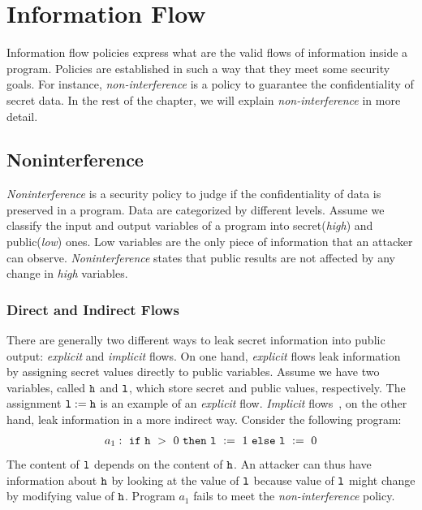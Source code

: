 \documentclass[a4paper]{report}
\begin{document}

\chapter{Information Flow}

Information flow policies express what are the valid flows of information
inside a program. Policies are established in such a way that they meet
some security goals. For instance, {\it non-interference} is a policy to
guarantee the confidentiality of secret data. In the rest of the chapter, we will explain
{\it non-interference} in more detail.

\section{Noninterference}
\label{chap2:noninterference}
{\it Noninterference} is a security policy to judge if the confidentiality of data
is preserved in a program. Data are categorized by different levels.
Assume we classify the input and output variables of a program 
into secret({\it high}) and public({\it low}) ones. 
Low variables are the only piece of information that an attacker can observe.
{\it Noninterference} states that public results are not affected by any
change in {\it high} variables. 

\subsection{Direct and Indirect Flows}
There are generally two different ways to leak secret information into
public output: {\it explicit} and {\it implicit} flows. 
On one hand,
{\it explicit} flows leak information by assigning secret values
directly to public variables.
Assume we have two variables, called $\mathtt{h}$ and $\mathtt{l}$,
which store secret and public values, respectively. 
The assignment $\mathtt{l} := \mathtt{h}$ is an example of an {\it explicit} flow.
{\it Implicit} flows~\cite{Denning:Denning:Certification}, on the other hand,
leak information in a more indirect way.
Consider the following program:
\begin{align*}
a_1:~\mathtt{if}~\mathtt{h}~>~0~\mathtt{then}~\mathtt{l}~:=~1~\mathtt{else}~\mathtt{l}~:=~0
\end{align*}
The content of $\mathtt{l}$ depends on the content of $\mathtt{h}$.
An attacker can thus have information about $\mathtt{h}$ by looking at
the value of $\mathtt{l}$ because value of $\mathtt{l}$ might change by
modifying value of $\mathtt{h}$. 
Program $a_1$ fails to meet the {\it non-interference} policy.
\end{document}
